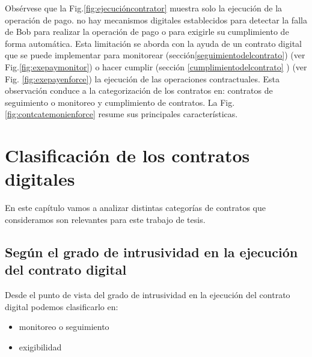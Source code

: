 \documentclass[12pt]{report} %
\begin{document}
Obsérvese que la Fig.\ref{fig:ejecucióncontrator} muestra solo la ejecución de la operación de pago. no hay mecanismos digitales establecidos para detectar la falla de Bob para realizar la operación de pago o para exigirle su cumplimiento de forma automática. Esta limitación  se aborda con la ayuda de un contrato digital que se puede implementar para monitorear (sección\ref {seguimientodelcontrato}) (ver Fig.\ref{fig:exepaymonitor}) o hacer cumplir (sección \ref {cumplimientodelcontrato} ) (ver Fig. \ref{fig:exepayenforce}) la ejecución de las operaciones contractuales. Esta observación conduce a la categorización de los contratos en: contratos de seguimiento o monitoreo y cumplimiento de contratos. La Fig. \ref{fig:contcatemonienforce} resume sus principales características.


\chapter{Clasificación de los contratos digitales}
\label{clasificaciondeloscontratosdigitales}

En este capítulo vamos a analizar distintas categorías de contratos que consideramos son relevantes para este trabajo de tesis.

\section{Según el grado de intrusividad en la ejecución del contrato digital}

Desde el punto de vista del grado de intrusividad en la ejecución del contrato digital podemos clasificarlo en: 

\begin{itemize}
    \item monitoreo o seguimiento
    \item  exigibilidad 
\end{itemize}
\end{document}
